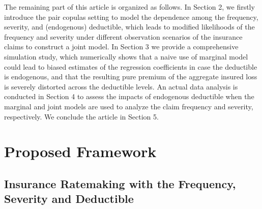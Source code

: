\documentclass[11pt]{article}
\newcommand{\rev}[1]{{\color{blue}#1}}
\begin{document}
The remaining part of this article is organized as follows.  In Section 2, we firstly introduce the pair copulas setting to model the dependence among the frequency, severity, and (endogenous) deductible, which leads to modified likelihoods of the frequency and severity under different \rev{observation} scenarios \rev{of the insurance claims} to construct a joint model. In Section 3 we provide a comprehensive simulation study, which numerically shows that a naive use of marginal model could lead to biased estimates of the regression coefficients in case the deductible is endogenous\rev{, and that the resulting pure premium of the aggregate insured loss is severely distorted across the deductible levels}.  An actual data analysis is conducted in Section 4 to assess the impacts of endogenous deductible when the marginal and joint models are used to analyze the claim frequency and severity, respectively. We conclude the article in Section 5.

\section{Proposed Framework}

\subsection{Insurance Ratemaking with the Frequency, Severity and Deductible}
\end{document}
